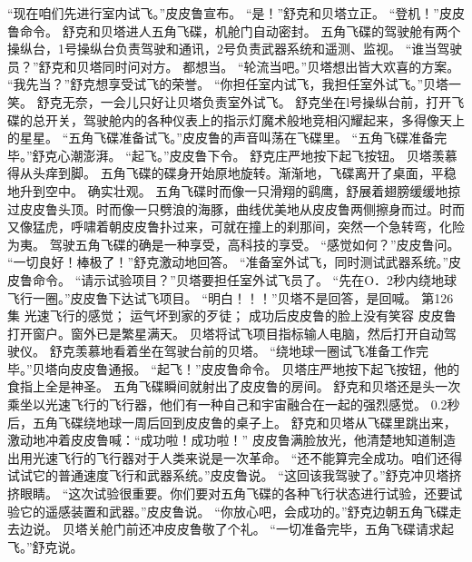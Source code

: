 \documentclass[a4paper,12pt,UTF8,twoside]{ctexbook}
\begin{document}
        “现在咱们先进行室内试飞。”皮皮鲁宣布。 
        “是！”舒克和贝塔立正。 
        “登机！”皮皮鲁命令。 
        舒克和贝塔进人五角飞碟，机舱门自动密封。 
        五角飞碟的驾驶舱有两个操纵台，1号操纵台负责驾驶和通讯，2号负责武器系统和遥测、监视。 
        “谁当驾驶员？”舒克和贝塔同时问对方。 
        都想当。 
        “轮流当吧。”贝塔想出皆大欢喜的方案。 
        “我先当？”舒克想享受试飞的荣誉。 
        “你担任室内试飞，我担任室外试飞。”贝塔一笑。 
        舒克无奈，一会儿只好让贝塔负责室外试飞。 
        舒克坐在l号操纵台前，打开飞碟的总开关，驾驶舱内的各种仪表上的指示灯魔术般地竞相闪耀起来，多得像天上的星星。 
        “五角飞碟准备试飞。”皮皮鲁的声音叫荡在飞碟里。 
        “五角飞碟准备完毕。”舒克心潮澎湃。 
        “起飞。”皮皮鲁下令。 
        舒克庄严地按下起飞按钮。 
        贝塔羡慕得从头痒到脚。 
        五角飞碟的碟身开始原地旋转。渐渐地，飞碟离开了桌面，平稳地升到空中。 
        确实壮观。 
        五角飞碟时而像一只滑翔的鹞鹰，舒展着翅膀缓缓地掠过皮皮鲁头顶。时而像一只劈浪的海豚，曲线优美地从皮皮鲁两侧擦身而过。时而又像猛虎，呼啸着朝皮皮鲁扑过来，可就在撞上的刹那间，突然一个急转弯，化险为夷。 
        驾驶五角飞碟的确是一种享受，高科技的享受。 
        “感觉如何？”皮皮鲁问。 
        “一切良好！棒极了！”舒克激动地回答。 
        “准备室外试飞，同时测试武器系统。”皮皮鲁命令。 
        “请示试验项目？”贝塔要担任室外试飞员了。 
        “先在O．2秒内绕地球飞行一圈。”皮皮鲁下达试飞项目。 
        “明白！！！”贝塔不是回答，是回喊。   第126集 
        光速飞行的感觉； 
        运气坏到家的歹徒； 
        成功后皮皮鲁的脸上没有笑容 
        皮皮鲁打开窗户。窗外已是繁星满天。 
        贝塔将试飞项目指标输人电脑，然后打开自动驾驶仪。 
        舒克羡慕地看着坐在驾驶台前的贝塔。 
        “绕地球一圈试飞准备工作完毕。”贝塔向皮皮鲁通报。 
        “起飞！”皮皮鲁命令。 
        贝塔庄严地按下起飞按钮，他的食指上全是神圣。 
        五角飞碟瞬间就射出了皮皮鲁的房间。 
        舒克和贝塔还是头一次乘坐以光速飞行的飞行器，他们有一种自己和宇宙融合在一起的强烈感觉。 
        0.2秒后，五角飞碟绕地球一周后回到皮皮鲁的桌子上。 
        舒克和贝塔从飞碟里跳出来，激动地冲着皮皮鲁喊：“成功啦！成功啦！” 
        皮皮鲁满脸放光，他清楚地知道制造出用光速飞行的飞行器对于人类来说是一次革命。 
        “还不能算完全成功。咱们还得试试它的普通速度飞行和武器系统。”皮皮鲁说。 
        “这回该我驾驶了。”舒克冲贝塔挤挤眼睛。 
        “这次试验很重要。你们要对五角飞碟的各种飞行状态进行试验，还要试验它的遥感装置和武器。”皮皮鲁说。 
        “你放心吧，会成功的。”舒克边朝五角飞碟走去边说。 
        贝塔关舱门前还冲皮皮鲁敬了个礼。 
        “一切准备完毕，五角飞碟请求起飞。”舒克说。 
\end{document}
